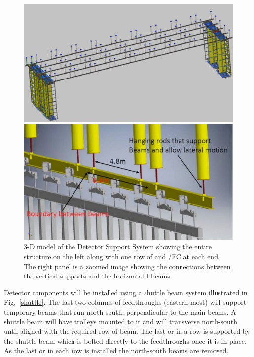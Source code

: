 \begin{figure}[htbp]
\begin{center}
\begin{minipage}[c]{0.49\textwidth}
\includegraphics[width=\textwidth]{far-detector-single-phase/figures/DSS-1.pdf}
\end{minipage}
\begin{minipage}[c]{0.49\textwidth}
\includegraphics[width=\textwidth]{far-detector-single-phase/figures/DSS-2.pdf}
\end{minipage}
\caption{3-D model of the Detector Support System showing the entire
  structure on the left along with one row of  and
  /FC at each end. The right panel is a zoomed image
  showing the connections between the vertical supports and the
  horizontal I-beams.}
\label{fig:DSS}
\end{center}
\end{figure}


Detector components will be installed using a shuttle beam system
illustrated in Fig.~\ref{shuttle}.  The last two columns of
feedthroughs (eastern most) will support temporary beams that run
north-south, perpendicular to the main  beams.  A shuttle
beam
will have trolleys mounted to it and will transverse
north-south until aligned with the required row of  beam.  The last
 or  in a row is supported by the shuttle beam which is bolted
directly to the feedthroughs once it is in place.  As the last  or
 in each row is installed the north-south beams are removed.

